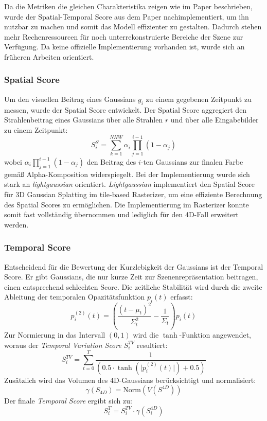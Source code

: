 Da die Metriken die gleichen Charakteristika zeigen wie im Paper beschrieben, wurde der Spatial-Temporal Score aus dem Paper nachimplementiert, um ihn nutzbar zu machen und somit das Modell effizienter zu gestalten.
Dadurch stehen mehr Rechenressourcen für noch unterrekonstruierte Bereiche der Szene zur Verfügung.
Da keine offizielle Implementierung vorhanden ist, wurde sich an früheren Arbeiten orientiert.

\subsubsection{Spatial Score}  
Um den visuellen Beitrag eines Gaussians $g_i$ zu einem gegebenen Zeitpunkt zu messen, wurde der Spatial Score entwickelt.
Der Spatial Score aggregiert den Strahlenbeitrag eines Gaussians über alle Strahlen $r$ und über alle Eingabebilder zu einem Zeitpunkt:  
\[
S_i^S = \sum_{k=1}^{NHW} \alpha_i \prod_{j=1}^{i-1} (1 - \alpha_j)
\]
wobei $\alpha_i \prod_{j=1}^{i-1} (1 - \alpha_j)$ den Beitrag des $i$-ten Gaussians zur finalen Farbe gemäß Alpha-Komposition widerspiegelt.
Bei der Implementierung wurde sich stark an \emph{lightgaussian} orientiert.
\emph{Lightgaussian} implementiert den Spatial Score für 3D Gaussian Splatting im tile-based Rasterizer, um eine effiziente Berechnung des Spatial Scores zu ermöglichen.
Die Implementierung im Rasterizer konnte somit fast vollständig übernommen und lediglich für den 4D-Fall erweitert werden.

\subsubsection{Temporal Score}  
Entscheidend für die Bewertung der Kurzlebigkeit der Gaussians ist der Temporal Score.
Er gibt Gaussians, die nur kurze Zeit zur Szenenrepräsentation beitragen, einen entsprechend schlechten Score.
Die zeitliche Stabilität wird durch die zweite Ableitung der temporalen Opazitätsfunktion $p_i(t)$ erfasst:
\[
p_i^{(2)}(t) = \left( \frac{(t - \mu_t)^2}{\Sigma_t^2} - \frac{1}{\Sigma_t} \right) p_i(t)
\]
Zur Normierung in das Intervall $(0, 1)$ wird die $\tanh$-Funktion angewendet, woraus der \emph{Temporal Variation Score} $S_i^{TV}$ resultiert:
\[
S_i^{TV} = \sum_{t=0}^{T}  \frac{1}{\left( 0.5 \cdot   \tanh(\lvert p_i^{(2)}(t) \rvert) + 0.5 \right)}
\]
Zusätzlich wird das Volumen des 4D-Gaussians berücksichtigt und normalisiert:
\[
\gamma(S_{4D}) = \text{Norm}(V(S^{4D}))
\]
Der finale \emph{Temporal Score} ergibt sich zu:
\[
S_i^T = S_i^{TV} \cdot \gamma(S_i^{4D})
\]

